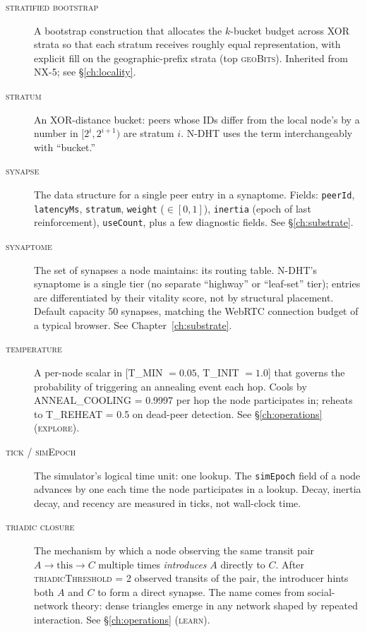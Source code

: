 \documentclass[twoside,nobib]{tufte-book}
\newcommand{\NDHT}{N-DHT\xspace}
\begin{document}
\begin{description}
\item[\textsc{stratified bootstrap}]
A bootstrap construction that allocates the $k$-bucket budget
across XOR strata so that each stratum receives roughly equal
representation, with explicit fill on the geographic-prefix strata
(top \textsc{geoBits}). Inherited from NX-5;
see \S\ref{ch:locality}.

\item[\textsc{stratum}]
An XOR-distance bucket: peers whose IDs differ from the local
node's by a number in $[2^i, 2^{i+1})$ are stratum $i$. \NDHT uses
the term interchangeably with ``bucket.''

\item[\textsc{synapse}]
The data structure for a single peer entry in a synaptome. Fields:
\texttt{peerId}, \texttt{latencyMs}, \texttt{stratum},
\texttt{weight} ($\in [0, 1]$), \texttt{inertia} (epoch of last
reinforcement), \texttt{useCount}, plus a few diagnostic fields.
See \S\ref{ch:substrate}.

\item[\textsc{synaptome}]
The set of synapses a node maintains: its routing table. \NDHT's
synaptome is a single tier (no separate ``highway'' or
``leaf-set'' tier); entries are differentiated by their vitality
score, not by structural placement. Default capacity 50 synapses,
matching the WebRTC connection budget of a typical browser. See
Chapter~\ref{ch:substrate}.

\item[\textsc{temperature}]
A per-node scalar in [\textsc{T\_MIN} $= 0.05$, \textsc{T\_INIT} $=
1.0$] that governs the probability of triggering an annealing
event each hop. Cools by \textsc{ANNEAL\_COOLING} = 0.9997 per
hop the node participates in; reheats to \textsc{T\_REHEAT} =
0.5 on dead-peer detection. See \S\ref{ch:operations}
(\textsc{explore}).

\item[\textsc{tick / simEpoch}]
The simulator's logical time unit: one lookup. The
\texttt{simEpoch} field of a node advances by one each time the
node participates in a lookup. Decay, inertia decay, and recency
are measured in ticks, not wall-clock time.

\item[\textsc{triadic closure}]
The mechanism by which a node observing the same transit pair $A
\to \mathrm{this} \to C$ multiple times \emph{introduces} $A$
directly to $C$. After \textsc{triadicThreshold} = 2 observed
transits of the pair, the introducer hints both $A$ and $C$ to
form a direct synapse. The name comes from social-network theory:
dense triangles emerge in any network shaped by repeated
interaction. See \S\ref{ch:operations} (\textsc{learn}).


\end{description}
\end{document}
